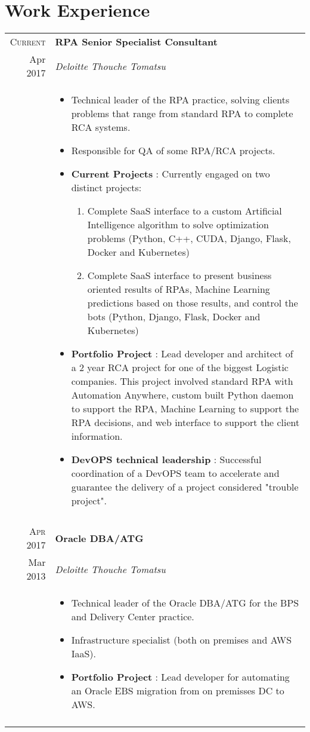 \documentclass[10pt,a4paper]{article}
\newcommand{\br}{\\\multicolumn{2}{c}{}}
\begin{document}
\section{Work Experience}
\begin{tabular}{r|p{16cm}}
    \textsc{Current}  & \textbf{RPA Senior Specialist Consultant}  \\
    Apr 2017         & \textit{Deloitte Thouche Tomatsu}\\ &
    \begin{itemize}
        \item Technical leader of the RPA practice, solving clients problems that range from standard RPA to complete RCA systems.
        \item Responsible for QA of some RPA/RCA projects.
        \item \textbf{Current Projects} : Currently engaged on two distinct projects:
        \begin{enumerate}
        	\item Complete SaaS interface to a custom Artificial Intelligence algorithm to solve optimization problems (Python, C++, CUDA, Django, Flask, Docker and Kubernetes)
        	\item Complete SaaS interface to present business oriented results of RPAs, Machine Learning predictions based on those results, and control the bots (Python, Django, Flask, Docker and Kubernetes)
        \end{enumerate}
        \item \textbf{Portfolio Project} : Lead developer and architect of a 2 year RCA project for one of the biggest Logistic companies. This project involved standard RPA with Automation Anywhere, custom built Python daemon to support the RPA, Machine Learning to support the RPA decisions, and web interface to support the client information.
        \item \textbf{DevOPS technical leadership} : Successful coordination of a DevOPS team to accelerate and guarantee the delivery of a project considered "trouble project".
    \end{itemize} \br\\

    \textsc{Apr 2017} & \textbf{Oracle DBA/ATG} \\
    Mar 2013           & \textit{Deloitte Thouche Tomatsu}\\ &
    \begin{itemize}
        \item Technical leader of the Oracle DBA/ATG for the BPS and Delivery Center practice.
        \item Infrastructure specialist (both on premises and AWS IaaS).
        \item \textbf{Portfolio Project} : Lead developer for automating an Oracle EBS migration from on premisses DC to AWS.
    \end{itemize} \br\\


\end{tabular}
\end{document}
